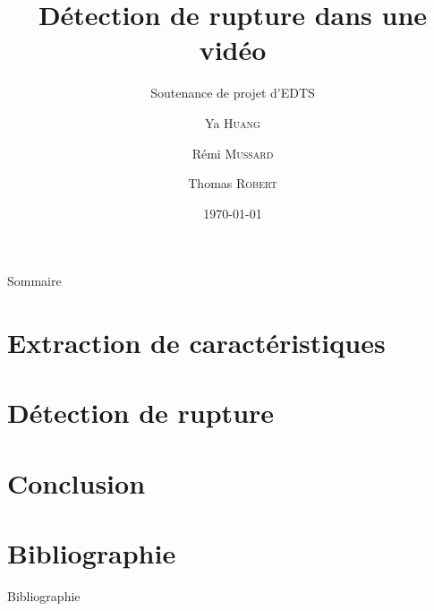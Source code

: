 \documentclass[compress,xcolor=table]{beamer}
\title{Détection de rupture dans une vidéo}
\subtitle{Soutenance de projet d'EDTS}
\date{\today}
\author{Ya \textsc{Huang} \and Rémi \textsc{Mussard} \and Thomas \textsc{Robert}}
\institute{Institut National des Sciences Appliquées de Rouen}
\begin{document}
\begin{frame}[plain]
	\titlepage
    \setcounter{framenumber}{0}
\end{frame}

\begin{frame}{Sommaire}
\begin{minipage}{\textwidth}
   \linespread{1.35}
	\tableofcontents[hideallsubsections]
\end{minipage}
\end{frame}

\section{Extraction de caractéristiques}
\subsection{}


\section{Détection de rupture}
\subsection{}


\section{Conclusion}
\subsection{}


\section{Bibliographie}
\begin{frame}[allowframebreaks]{Bibliographie}


 \end{frame}
\end{document}
